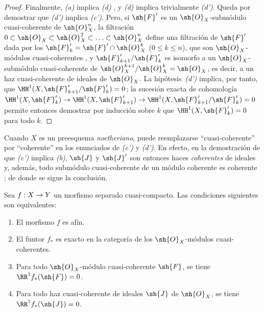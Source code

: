 \documentclass[oneside,10pt]{amsart}
\makeatletter
\renewcommand{\leq}{\leqslant}
\newcommand{\ega@arrow}[2]{\mathchoice{#1}{#2}{#2}{#2}}
\renewcommand{\to}{\ega@arrow{\longrightarrow}{\rightarrow}}
\let\EGAOriginalLabel\label
\renewcommand{\label}[1]{\phantomsection\EGAOriginalLabel{#1}}
\makeatother
\begin{document}
\begin{proof}
Finalmente, \emph{(a)} implica \emph{(d)} , y \emph{(d)} implica trivialmente \emph{(d')}.
Queda por demostrar que \emph{(d')} implica \emph{(c')}.
Pero, si $\sh{F}'$ es un $\sh{O}_X$-submódulo cuasi-coherente de $\sh{O}_X^n$, la filtración $0\subset\sh{O}_X\subset\sh{O}_X^2\subset\ldots\subset\sh{O}_X^n$ define una filtración de $\sh{F}'$ dada por los $\sh{F}'_k=\sh{F}'\cap\sh{O}_X^k$ ($0\leq k\leq n$), que son $\sh{O}_X$-módulos cuasi-coherentes , y $\sh{F}'_{k+1}/\sh{F}'_k$ es isomorfo a un $\sh{O}_X$-submódulo cuasi-coherente de $\sh{O}_X^{k+1}/\sh{O}_X^k=\sh{O}_X$, es decir, a un haz cuasi-coherente de ideales de $\sh{O}_X$.
La hipótesis~\emph{(d')} implica, por tanto, que $\HH^1(X,\sh{F}'_{k+1}/\sh{F}'_k)=0$;
la sucesión exacta de cohomología $\HH^1(X,\sh{F}'_k)\to\HH^1(X,\sh{F}'_{k+1})\to\HH^1(X,\sh{F}'_{k+1}/\sh{F}'_k)=0$ permite entonces demostrar por inducción sobre $k$ que $\HH^1(X,\sh{F}'_k)=0$ para todo $k$.
\end{proof}

\begin{remark}[5.2.1.1]
\label{II.5.2.1.1}
Cuando $X$ es un preesquema \emph{noetheriano}, puede reemplazarse ``cuasi-coherente'' por ``coherente'' en los enunciados de \emph{(c')} y \emph{(d')}.
En efecto, en la demostración de que \emph{(c')} implica \emph{(b)}, $\sh{J}$ y $\sh{J}'$ son entonces haces \emph{coherentes} de ideales y, además, todo submódulo cuasi-coherente de un módulo coherente es coherente ;
de donde se sigue la conclusión.
\end{remark}

\begin{corollary}[5.2.2]
\label{II.5.2.2}
Sea $f:X\to Y$ un morfismo separado cuasi-compacto.
Las condiciones siguientes son equivalentes:
\begin{enumerate}
  \item[{\rm(a)}] El morfismo $f$ es afín.
  \item[{\rm(b)}] El funtor $f_*$ es exacto en la categoría de los $\sh{O}_X$-módulos cuasi-coherentes.
  \item[{\rm(c)}] Para todo $\sh{O}_X$-módulo cuasi-coherente $\sh{F}$, se tiene $\RR^1f_*(\sh{F})=0$.
  \item[{\rm(c')}] Para todo haz cuasi-coherente de ideales $\sh{J}$ de $\sh{O}_X$, se tiene $\RR^1f_*(\sh{J})=0$.
\end{enumerate}
\end{corollary}
\end{document}
